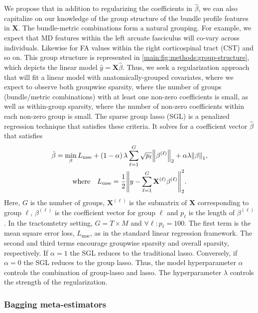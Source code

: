 \documentclass[10pt,%
               aps,%
               prl,%
               reprint,%
               superscriptaddress,%
               preprintnumbers,%
               linenumbers,%
               amsmath,%
               floatfix]{revtex4-2}
\begin{document}
We propose that in addition to regularizing the coefficients in
$\hat{\beta}$, we can also capitalize on our knowledge of the group structure
of the bundle profile features in $\mathbf{X}$. The bundle-metric
combinations form a natural grouping. For example, we expect that MD features
within the left arcuate fasciculus will co-vary across individuals. Likewise
for FA values within the right corticospinal tract (CST) and so on. This
group structure is represented in \cref{main:fig:methods:group-structure}, which
depicts the linear model $\hat{y} = \mathbf{X} \hat{\beta}$. Thus, we seek a
regularization approach that will fit a linear model with
anatomically-grouped covariates, where we expect to observe both groupwise
sparsity, where the number of groups (bundle/metric combinations) with at
least one non-zero coefficients is small, as well as within-group sparsity,
where the number of non-zero coefficients within each non-zero group is
small. The sparse group lasso (SGL) is a penalized regression technique that
satisfies these criteria\cite{simon2013sparse}. It solves for a
coefficient vector $\hat{\beta}$ that satisfies
\begin{multline}
    \hat{\beta} = \min_\beta L_{\text{mse}}
    + \left( 1 - \alpha \right) \lambda \displaystyle \sum_{\ell = 1}^{G}
    \sqrt{p_\ell} \norm{\beta^{(\ell)}}_2
    + \alpha \lambda \norm{\beta}_1,\\%
    \text{where} \quad
    L_{\text{mse}} = \frac{1}{2}
    \norm{y - \displaystyle \sum_{\ell = 1}^{G}
    \mathbf{X}^{(\ell)} \beta^{(\ell)}}_2^2.
    \label{eq:sgl}
\end{multline}
Here, $G$ is the number of groups, $\mathbf{X}^{(\ell)}$ is the submatrix of
$\mathbf{X}$ corresponding to group $\ell$, $\beta^{(\ell)}$ is the
coefficient vector for group $\ell$ and $p_\ell$ is the length of
$\beta^{(\ell)}$. In the tractomtetry setting, $G = T \times M$ and $\forall
\ell: p_\ell = 100$. The first term is the mean square error loss,
$L_{\text{mse}}$, as in the standard linear regression framework. The second
and third terms encourage groupwise sparsity and overall sparsity,
respectively. If $\alpha = 1$ the SGL reduces to the traditional
lasso\cite{tibshirani1996regression}. Conversely, if $\alpha = 0$ the SGL
reduces to the group lasso\cite{yuan2006model}. Thus, the model
hyperparameter $\alpha$ controls the combination of group-lasso and lasso.
The hyperparameter $\lambda$ controls the strength of the regularization.

\subsubsection{Bagging meta-estimators}
\end{document}
